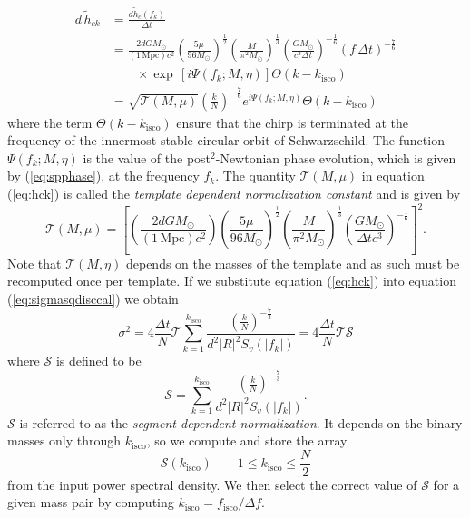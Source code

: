 \begin{equation}
\begin{split}
\label{eq:hck}
d\,\tilde{h}_{ck} &= \frac{d \tilde{h}_c(f_k)}{\Delta t} \\
&= 
\frac{2dGM_\odot}{(1\,\mathrm{Mpc}) c^2}
\left(\frac{5\mu}{96M_\odot}\right)^\frac{1}{2}
\left(\frac{M}{\pi^2M_\odot}\right)^\frac{1}{3}
\left(\frac{GM_\odot}{c^3\Delta t}\right)^{-\frac{1}{6}}
\left( f\,\Delta t \right)^{-\frac{7}{6}} \\
&\quad\quad\times\exp\,[i\Psi(f_k;M,\eta)] \Theta\left(k-k_\mathrm{isco}\right)\\
&=
\sqrt{\mathcal{T}(M,\mu)}\left(\frac{k}{N}\right)^{-\frac{7}{6}}
e^{i\Psi\left(f_k;M,\eta\right)} \Theta\left(k-k_\mathrm{isco}\right)
\end{split}
\end{equation}
where the term $\Theta\left(k-k_\mathrm{isco}\right)$ ensure that the chirp is
terminated at the frequency of the innermost stable circular orbit of
Schwarzschild. The function $\Psi(f_k;M,\eta)$ is the value of the
post$^2$-Newtonian phase evolution, which is given by (\ref{eq:spphase}), at
the frequency $f_k$. The quantity $\mathcal{T}(M,\mu)$ in equation
(\ref{eq:hck}) is called the \emph{template dependent normalization constant}
and is given by
\begin{equation}
\mathcal{T}(M,\mu) = \left[
\left(\frac{2dGM_\odot}{(1\,\mathrm{Mpc})c^2}\right)
\left(\frac{5\mu}{96M_\odot}\right)^\frac{1}{2}
\left(\frac{M}{\pi^2M_\odot}\right)^\frac{1}{3}
\left(\frac{GM_\odot}{\Delta tc^3}\right)^{-\frac{1}{6}}
\right]^2.
\end{equation}
Note that $\mathcal{T}(M,\eta)$ depends on the masses of the template and as
such must be recomputed once per template. If we substitute equation
(\ref{eq:hck}) into equation (\ref{eq:sigmasqdisccal}) we obtain
\begin{equation}
\label{eq:sigmasqts}
\sigma^2 = 4 \frac{\Delta t}{N} \mathcal{T} 
\sum_{k=1}^{k_\mathrm{isco}} 
\frac{\left(\frac{k}{N}\right)^{-\frac{7}{3}}}
{d^2|R|^2S_v\left(\left|f_k\right|\right)}
= 4 \frac{\Delta t}{N} \mathcal{T} \mathcal{S}
\end{equation}
where $\mathcal{S}$ is defined to be
\begin{equation}
\mathcal{S} = 
\sum_{k=1}^{k_\mathrm{isco}} 
\frac{\left(\frac{k}{N}\right)^{-\frac{7}{3}}}{d^2|R|^2S_v\left(\left|f_k\right|\right)}.
\end{equation}
$\mathcal{S}$ is referred to as the \emph{segment dependent normalization}.
It depends on the binary masses only through $k_\mathrm{isco}$, so we compute
and store the array 
\begin{equation}
\mathcal{S}(k_\mathrm{isco}) \quad \quad 1 \le k_\mathrm{isco} \le \frac{N}{2}
\end{equation}
from the input power spectral density. We then select the correct value of
$\mathcal{S}$ for a given mass pair by computing $k_\mathrm{isco} =
f_\mathrm{isco} / \Delta f$.

